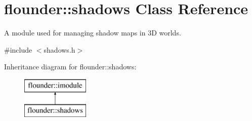 \hypertarget{classflounder_1_1shadows}{}\section{flounder\+:\+:shadows Class Reference}
\label{classflounder_1_1shadows}


A module used for managing shadow maps in 3D worlds.  




{\ttfamily \#include $<$shadows.\+h$>$}

Inheritance diagram for flounder\+:\+:shadows\+:\begin{figure}[H]
\begin{center}
\leavevmode
\includegraphics[height=2.000000cm]{classflounder_1_1shadows}
\end{center}
\end{figure}
